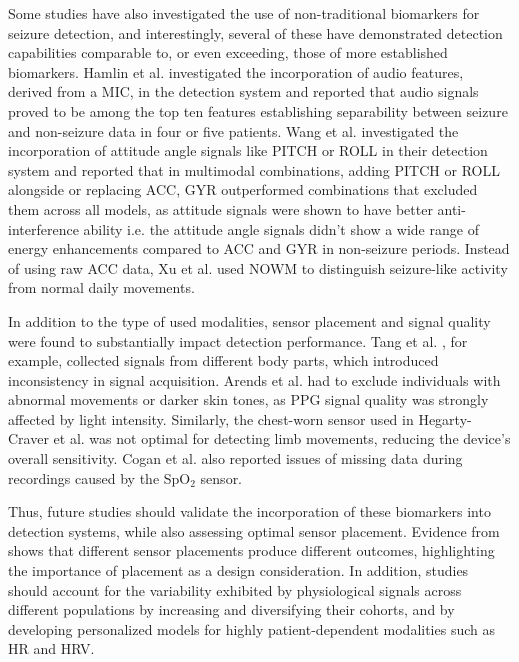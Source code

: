 Some studies have also investigated the use of non-traditional biomarkers for seizure detection, and interestingly, several of these have demonstrated detection capabilities comparable to, or even exceeding, those of more established biomarkers. Hamlin et al. \cite{Hamlin2021-sd} investigated the incorporation of audio features, derived from a MIC, in the detection system and reported that audio signals proved to be among the top ten features establishing separability between seizure and non-seizure data in four or five patients. Wang et al. \cite{Wang2025-ql} investigated the incorporation of attitude angle signals  like PITCH or ROLL in their detection system and reported that in multimodal combinations, adding PITCH or ROLL alongside or replacing ACC, GYR outperformed combinations that excluded them across all models, as attitude signals were shown to have better anti-interference ability i.e. the attitude angle signals didn’t show a wide range of energy enhancements compared to ACC and GYR in non-seizure periods.  Instead of using raw ACC data, Xu et al. \cite{Xu2022-tx} used NOWM to distinguish seizure-like activity from normal daily movements.

In addition to the type of used modalities, sensor placement and signal quality were found to substantially impact detection performance. Tang et al. \cite{Tang2021-td}, for example, collected signals from different body parts, which introduced inconsistency in signal acquisition. Arends et al. \cite{Arends2018-ew} had to exclude individuals with abnormal movements or darker skin tones, as PPG signal quality was strongly affected by light intensity. Similarly, the chest-worn sensor used in Hegarty-Craver et al. \cite{Hegarty-Craver2021-hk} was not optimal for detecting limb movements, reducing the device’s overall sensitivity. Cogan et al. \cite{Cogan2017-lg} also reported issues of missing data during recordings caused by the SpO$_2$ sensor.

Thus, future studies should validate the incorporation of these biomarkers into detection systems, while also assessing optimal sensor placement. Evidence from \cite{Milosevic2016-ee,De_Cooman2018-pq} shows that different sensor placements produce different outcomes, highlighting the importance of placement as a design consideration. In addition, studies should account for the variability exhibited by physiological signals across different populations by increasing and diversifying their cohorts, and by developing personalized models for highly patient-dependent modalities such as HR and HRV.

